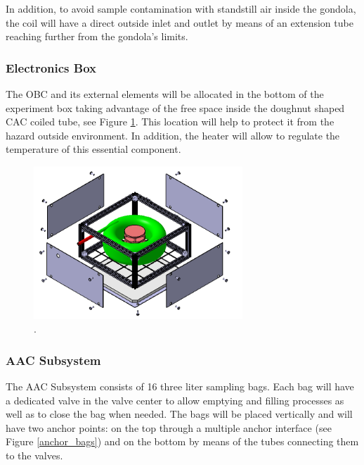 \smallskip
In addition, to avoid sample contamination with standstill air inside the gondola, the coil will have a direct outside inlet and outlet by means of an extension tube reaching further from the gondola’s limits.


\pagebreak
\subsubsection{Electronics Box}

The OBC and its external elements will be allocated in the bottom of the experiment box taking advantage of the free space inside the doughnut shaped CAC coiled tube, see Figure \ref{electronics_box}. This location will help to protect it from the hazard outside environment. In addition, the heater will allow to regulate the temperature of this essential component.


\begin{figure}[!ht]
    \centering
    \includegraphics[width=0.7\textwidth]{4-experiment-design/img/explos_CAC.jpg}
    \caption{.}
    \label{electronics_box}
\end{figure}

\pagebreak
\subsubsection{AAC Subsystem}

The AAC Subsystem consists of 16 three liter sampling bags. Each bag will have a dedicated valve in the valve center to allow emptying and filling processes as well as to close the bag when needed. The bags will be placed vertically and will have two anchor points: on the top through a  multiple anchor interface (see Figure \ref{anchor_bags}) and on the bottom by means of the tubes connecting them to the valves.

